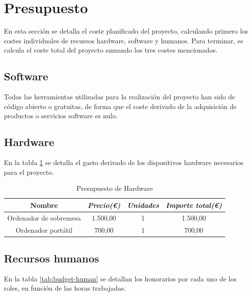 			\FloatBarrier

	\section{Presupuesto}

		En esta sección se detalla el coste planificado del proyecto, calculando primero los costes individuales de recursos hardware, software y humanos. Para terminar, se calcula el coste total del proyecto sumando los tres costes mencionados.

		\subsection{Software}

			Todas las herramientas utilizadas para la realización del proyecto han sido de código abierto o gratuitas, de forma que el coste derivado de la adquisición de productos o servicios software es nulo.

		\subsection{Hardware}

			En la tabla \ref{tab:budget-hardware} se detalla el gasto derivado de los dispositivos hardware necesarios para el proyecto.

			\begin{table}[htp]
				\centering
				\caption{Presupuesto de Hardware}\label{tab:budget-hardware}
				\begin{tabular}{cccc}
					\toprule
			    	\textbf{Nombre} & \emph{Precio(\euro)} & \emph{Unidades} & \emph{Importe total(\euro)}\\
			    	\midrule
			    	Ordenador de sobremesa			& 	1.500,00			&	1 			&	1.500,00					\\
			    	Ordenador portátil				&	700,00				&	1			&	700,00						\\
			    	\bottomrule
			    \end{tabular}
			\end{table}

		\subsection{Recursos humanos}

			En la tabla \ref{tab:budget-human} se detallan los honorarios por cada uno de los roles, en función de las horas trabajadas.

